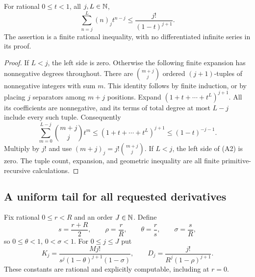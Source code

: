 \begin{lemma}
\label{lem:derivative-geometric}
For rational \(0\leq t<1\), all \(j,L\in\mathbb N\),
\[
            \sum_{n=j}^L(n)_j t^{n-j}
                      \leq \frac{j!}{(1-t)^{j+1}}.
\tag{A2}
\]
The assertion is a finite rational inequality, with no differentiated
infinite series in its proof.
\end{lemma}
\begin{proof}
If \(L<j\), the left side is zero. Otherwise the following finite expansion
has nonnegative degrees throughout.
There are \(\binom{m+j}{j}\) ordered \((j+1)\)-tuples of nonnegative
integers with sum \(m\). This identity follows by finite induction, or by
placing \(j\) separators among \(m+j\) positions.
Expand
\((1+t+\cdots+t^L)^{j+1}\).
All its coefficients are nonnegative, and its terms of total degree
at most \(L-j\) include every such tuple. Consequently
\[
\sum_{m=0}^{L-j}\binom{m+j}{j}t^m
 \leq(1+t+\cdots+t^L)^{j+1}
 \leq(1-t)^{-j-1}.
\]
Multiply by \(j!\) and use
\((m+j)_j=j!\binom{m+j}{j}\).
If \(L<j\), the left side of (A2) is zero.
The tuple count, expansion, and geometric inequality are all finite
primitive-recursive calculations.
\end{proof}

\subsection{A uniform tail for all requested derivatives}

Fix rational \(0\leq r<R\) and an order \(J\in\mathbb N\). Define
\[
s=\frac{r+R}{2},\qquad
\rho=\frac rR,\qquad \theta=\frac rs,\qquad \sigma=\frac sR ,
\]
so \(0\leq\theta<1\), \(0<\sigma<1\). For \(0\leq j\leq J\) put
\[
 K_j=\frac{M j!}
 {s^j(1-\theta)^{j+1}(1-\sigma)},\qquad
 D_j=\frac{j!}{R^j(1-\rho)^{j+1}}.
\tag{A3}
\]
These constants are rational and explicitly computable, including at \(r=0\).

